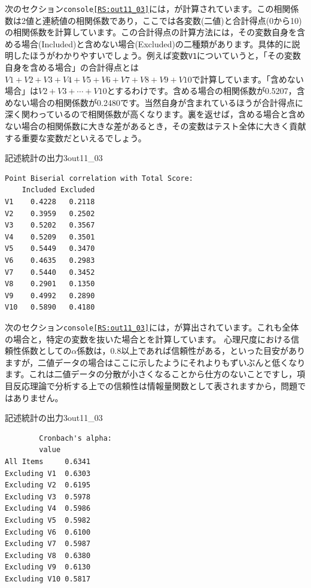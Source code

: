 \documentclass{ltjsbook}
\begin{document}
次のセクション\texttt{console\ref{RS:out11_03}}には，が計算されています。この相関係数は2値と連続値の相関係数であり，ここでは各変数(二値)と合計得点(0から10)の相関係数を計算しています。この合計得点の計算方法には，その変数自身を含める場合(Included)と含めない場合(Excluded)の二種類があります。具体的に説明したほうがわかりやすいでしょう。例えば変数\texttt{V1}についていうと，「その変数自身を含める場合」の合計得点とは$V1+V2+V3+V4+V5+V6+V7+V8+V9+V10$で計算しています。「含めない場合」は$V2+V3+\cdots+V10$とするわけです。含める場合の相関係数が0.5207，含めない場合の相関係数が0.2480です。当然自身が含まれているほうが合計得点に深く関わっているので相関係数が高くなります。裏を返せば，含める場合と含めない場合の相関係数に大きな差があるとき，その変数はテスト全体に大きく貢献する重要な変数だといえるでしょう。
\begin{Rscreen}{記述統計の出力3}{out11_03}
    \begin{verbatim}
Point Biserial correlation with Total Score:
    Included Excluded
V1    0.4228   0.2118
V2    0.3959   0.2502
V3    0.5202   0.3567
V4    0.5209   0.3501
V5    0.5449   0.3470
V6    0.4635   0.2983
V7    0.5440   0.3452
V8    0.2901   0.1350
V9    0.4992   0.2890
V10   0.5890   0.4180
    \end{verbatim}
\end{Rscreen}

次のセクション\texttt{console\ref{RS:out11_03}}には，が算出されています。これも全体の場合と，特定の変数を抜いた場合とを計算しています。
心理尺度における信頼性係数としての$\alpha$係数は，0.8以上であれば信頼性がある，といった目安がありますが，二値データの場合はここに示したようにそれよりもずいぶんと低くなります。これは二値データの分散が小さくなることから仕方のないことですし，項目反応理論で分析する上での信頼性は情報量関数として表されますから，問題ではありません。
\begin{Rscreen}{記述統計の出力3}{out11_03}
    \begin{verbatim}
        Cronbach's alpha:
        value
All Items     0.6341
Excluding V1  0.6303
Excluding V2  0.6195
Excluding V3  0.5978
Excluding V4  0.5986
Excluding V5  0.5982
Excluding V6  0.6100
Excluding V7  0.5987
Excluding V8  0.6380
Excluding V9  0.6130
Excluding V10 0.5817
    \end{verbatim}
\end{Rscreen}
\end{document}
